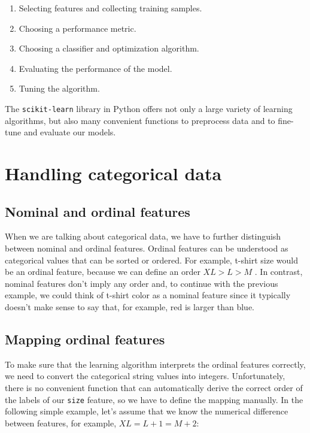 \documentclass[11pt]{article}
\begin{document}
    \begin{enumerate}
        \item Selecting features and collecting training samples.
        \item Choosing a performance metric.
        \item Choosing a classifier and optimization algorithm.
        \item Evaluating the performance of the model.
        \item Tuning the algorithm.
    \end{enumerate}

    The \texttt{scikit-learn} library in Python offers not only a large variety of learning algorithms, but also many convenient functions to preprocess data and to fine-tune and evaluate our models.

    \section{Handling categorical data} \label{sec:categorical_data}

    \subsection{Nominal and ordinal features} \label{subsec:nomical_and_ordinal_features}

    When we are talking about categorical data, we have to further distinguish between nominal and ordinal features.
    Ordinal features can be understood as categorical values that can be sorted or ordered.
    For example, t-shirt size would be an ordinal feature, because we can define an order $XL > L > M$ .
    In contrast, nominal features don't imply any order and, to continue with the previous example, we could think of t-shirt color as a nominal feature since it typically doesn't make sense to say that, for example, red is larger than blue.

    \subsection{Mapping ordinal features} \label{subsec:mapping_ordinal_features}

    To make sure that the learning algorithm interprets the ordinal features correctly, we need to convert the categorical string values into integers.
    Unfortunately, there is no convenient function that can automatically derive the correct order of the labels of our \texttt{size} feature, so we have to define the mapping manually.
    In the following simple example, let's assume that we know the numerical difference between features, for example, $XL = L + 1 = M + 2$:
\end{document}

